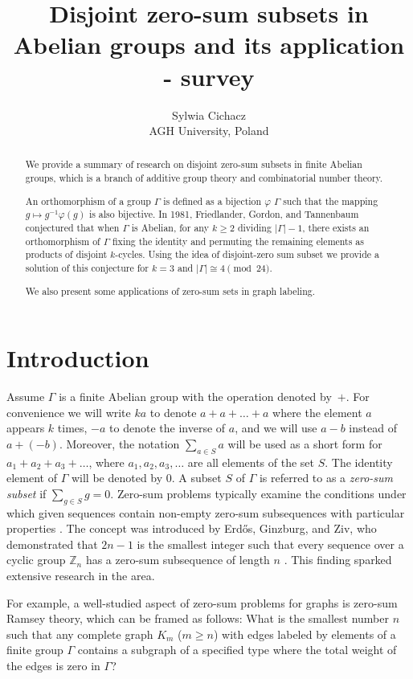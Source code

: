 \documentclass{article}
\title{Disjoint zero-sum subsets in Abelian groups and its application - survey}
\author{Sylwia Cichacz
\normalsize \\AGH University, \vspace{2mm} Poland\\
}
\begin{document}
\maketitle
\begin{abstract}
We provide a summary of research on disjoint zero-sum subsets in finite Abelian groups, which is a branch of additive group theory and combinatorial number theory.


An orthomorphism of a group $\Gamma$ is defined
as a bijection   $\varphi$ $\Gamma$ such that the mapping  $g \mapsto  g^{-1}\varphi(g)$ is
also bijective. In 1981, Friedlander, Gordon, and Tannenbaum conjectured that when $\Gamma$ is Abelian, for any $k \geq 2$ dividing $|\Gamma| -1$,
there exists an orthomorphism of $\Gamma$ fixing the identity and permuting the remaining elements as products of disjoint $k$-cycles. Using the idea of disjoint-zero sum subset we provide a solution of this conjecture for $k=3$ and $|\Gamma|\cong 4\pmod{24}$.

We also present some applications of zero-sum sets  in graph labeling. 
\end{abstract}




 \section{Introduction}
Assume $\Gamma$ is a finite Abelian group with the operation denoted by~$+$.
  For convenience
we will write $ka$ to denote $a + a + \ldots + a$ where the element $a$ appears $k$ times, $-a$ to denote the inverse of $a$, and
we will use $a - b$ instead of $a+(-b)$.  Moreover, the notation $\sum_{a\in S}{a}$ will be used as a short form for $a_1+a_2+a_3+\dots$, where $a_1, a_2, a_3, \dots$ are all elements of the set $S$. The identity element of $\Gamma$ will be denoted by $0$. A subset $S$ of $\Gamma$ is referred to as a \textit{zero-sum subset} if $\sum_{g\in S}g=0$. Zero-sum problems typically examine the conditions under which given sequences contain non-empty zero-sum subsequences with particular properties \cite{Gao}. The concept was introduced by Erd\H{o}s, Ginzburg, and Ziv, who demonstrated that $2n-1$ is the smallest integer such that every sequence over a cyclic group 
$\mathbb{Z}_n$   has a zero-sum subsequence of length 
$n$ \cite{ErdGinZiv}. This finding sparked extensive research in the area.

For example, a well-studied aspect of zero-sum problems for graphs is zero-sum Ramsey theory, which can be framed as follows: What is the smallest number $n$ such that any complete graph $K_m$ ($m\geq n$) with edges labeled by elements of a finite group 
$\Gamma$ contains a subgraph of a specified type where the total weight of the edges is zero in $\Gamma$?
\end{document}
